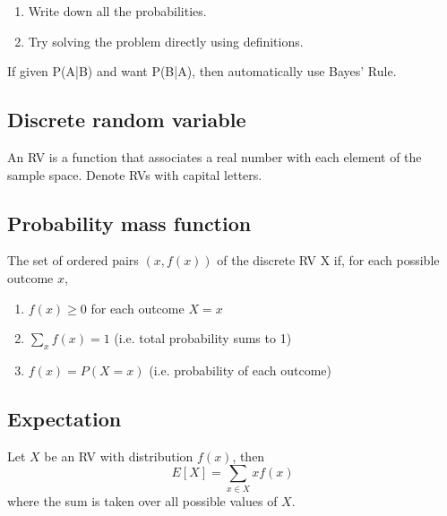     \begin{process}
        \begin{enumerate}
            \item Write down all the probabilities. 
            \item Try solving the problem directly using definitions. 
        \end{enumerate}
    \end{process}

    \begin{intuition}
        If given P(A|B) and want P(B|A), then automatically use Bayes’ Rule. 
    \end{intuition}

\subsection{Discrete random variable}
    \begin{definition}
        An RV is a function that associates a real number with each element of the sample space. Denote RVs with capital letters.    
    \end{definition}

\subsection{Probability mass function}
    \begin{definition}
        The set of ordered pairs $(x,f(x))$ of the discrete RV X if, for each possible outcome $x$, 
        \begin{enumerate}
            \item $f(x) \geq 0$ for each outcome $X=x$ 
            \item $\sum_{x} f(x) = 1$ (i.e. total probability sums to 1)
            \item $f(x) = P(X=x)$ (i.e. probability of each outcome)
        \end{enumerate}
    \end{definition}
    
\subsection{Expectation}
    \begin{definition}
        Let $X$ be an RV with distribution $f(x)$, then 
        \begin{equation}
            E[X] = \sum_{x\in X} xf(x)
        \end{equation}
        where the sum is taken over all possible values of $X$.
    \end{definition}

